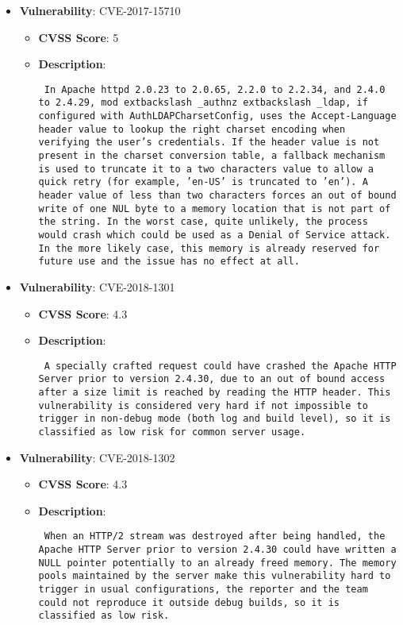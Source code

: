 \documentclass{article}
\begin{document}
\begin{itemize}
        \item \textbf{Vulnerability}: CVE-2017-15710
        \begin{itemize}
            \item \textbf{CVSS Score}:  5 
            \item \textbf{Description}: \parbox{\linewidth}{\texttt{ In Apache httpd 2.0.23 to 2.0.65, 2.2.0 to 2.2.34, and 2.4.0 to 2.4.29, mod	extbackslash _authnz	extbackslash _ldap, if configured with AuthLDAPCharsetConfig, uses the Accept-Language header value to lookup the right charset encoding when verifying the user's credentials. If the header value is not present in the charset conversion table, a fallback mechanism is used to truncate it to a two characters value to allow a quick retry (for example, 'en-US' is truncated to 'en'). A header value of less than two characters forces an out of bound write of one NUL byte to a memory location that is not part of the string. In the worst case, quite unlikely, the process would crash which could be used as a Denial of Service attack. In the more likely case, this memory is already reserved for future use and the issue has no effect at all. }}
        \end{itemize}
    
        \item \textbf{Vulnerability}: CVE-2018-1301
        \begin{itemize}
            \item \textbf{CVSS Score}:  4.3 
            \item \textbf{Description}: \parbox{\linewidth}{\texttt{ A specially crafted request could have crashed the Apache HTTP Server prior to version 2.4.30, due to an out of bound access after a size limit is reached by reading the HTTP header. This vulnerability is considered very hard if not impossible to trigger in non-debug mode (both log and build level), so it is classified as low risk for common server usage. }}
        \end{itemize}
    
        \item \textbf{Vulnerability}: CVE-2018-1302
        \begin{itemize}
            \item \textbf{CVSS Score}:  4.3 
            \item \textbf{Description}: \parbox{\linewidth}{\texttt{ When an HTTP/2 stream was destroyed after being handled, the Apache HTTP Server prior to version 2.4.30 could have written a NULL pointer potentially to an already freed memory. The memory pools maintained by the server make this vulnerability hard to trigger in usual configurations, the reporter and the team could not reproduce it outside debug builds, so it is classified as low risk. }}
        \end{itemize}
    

\end{itemize}
\end{document}
